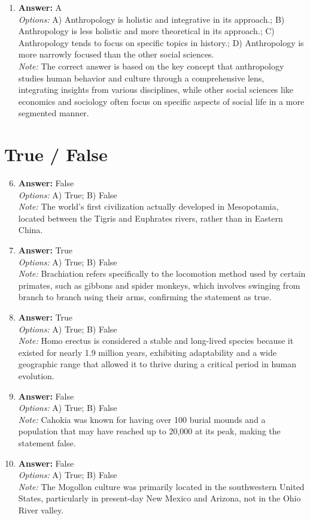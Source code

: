 \documentclass[12pt]{article}
\begin{document}
\begin{enumerate}[label=\arabic*.]
\item \textbf{Answer:} A
\\ \textit{Options:} A) Anthropology is holistic and integrative in its approach.; B) Anthropology is less holistic and more theoretical in its approach.; C) Anthropology tends to focus on specific topics in history.; D) Anthropology is more narrowly focused than the other social sciences.
\\ \textit{Note:} The correct answer is based on the key concept that anthropology studies human behavior and culture through a comprehensive lens, integrating insights from various disciplines, while other social sciences like economics and sociology often focus on specific aspects of social life in a more segmented manner.
\end{enumerate}

\section*{True / False}
\begin{enumerate}[label=\arabic*.]
\setcounter{enumi}{5}
\item \textbf{Answer:} False
\\ \textit{Options:} A) True; B) False
\\ \textit{Note:} The world's first civilization actually developed in Mesopotamia, located between the Tigris and Euphrates rivers, rather than in Eastern China.
\item \textbf{Answer:} True
\\ \textit{Options:} A) True; B) False
\\ \textit{Note:} Brachiation refers specifically to the locomotion method used by certain primates, such as gibbons and spider monkeys, which involves swinging from branch to branch using their arms, confirming the statement as true.
\item \textbf{Answer:} True
\\ \textit{Options:} A) True; B) False
\\ \textit{Note:} Homo erectus is considered a stable and long-lived species because it existed for nearly 1.9 million years, exhibiting adaptability and a wide geographic range that allowed it to thrive during a critical period in human evolution.
\item \textbf{Answer:} False
\\ \textit{Options:} A) True; B) False
\\ \textit{Note:} Cahokia was known for having over 100 burial mounds and a population that may have reached up to 20,000 at its peak, making the statement false.
\item \textbf{Answer:} False
\\ \textit{Options:} A) True; B) False
\\ \textit{Note:} The Mogollon culture was primarily located in the southwestern United States, particularly in present-day New Mexico and Arizona, not in the Ohio River valley.
\end{enumerate}
\end{document}
